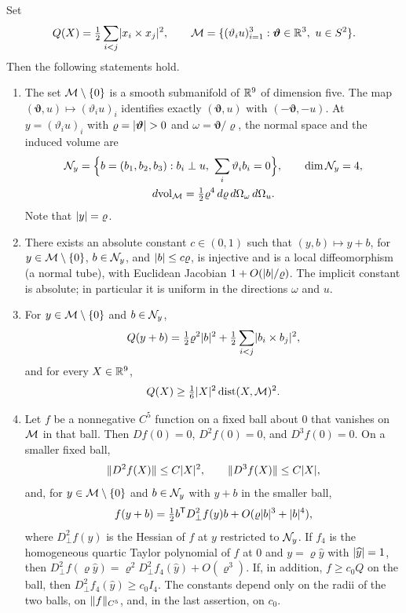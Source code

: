 \begin{lemma}\label{ch27:lem:commuting-cone}
Set
\[
 Q(X)=\tfrac12\sum_{i<j}\abs{x_i\times x_j}^2,\qquad\CommMan=\{(\vartheta_iu)_{i=1}^3:\bm\vartheta\in\R^3,\ u\in S^2\}.
\]
Then the following statements hold.
\begin{enumerate}
\item The set $\mathcal M\setminus\{0\}$ is a smooth submanifold of $\mathbb R^9$ of dimension five. The map $(\bm\vartheta,u)\mapsto(\vartheta_iu)_i$ identifies exactly $(\bm\vartheta,u)$ with $(-\bm\vartheta,-u)$. At $y=(\vartheta_iu)_i$ with $\varrho=\lvert \bm\vartheta\rvert>0$ and $\omega=\bm\vartheta/\varrho$, the normal space and the induced volume are
\begin{gather*}
 \NormalFiber y=\Bigl\{b=(b_1,b_2,b_3):b_i\perp u,\ \sum_i\vartheta_ib_i=0\Bigr\},\qquad\dim\NormalFiber y=4,\\
 d\mathrm{vol}_{\CommMan}=\tfrac12\varrho^4\,d\varrho\,d\Omega_\omega\,d\Omega_u.
\end{gather*}
Note that $\lvert y\rvert=\varrho$.
\item There exists an absolute constant $c\in(0,1)$ such that $(y,b)\mapsto y+b$, for $y\in\mathcal M\setminus\{0\}$, $b\in\mathcal N_{y}$, and $\lvert b\rvert\le c\varrho$, is injective and is a local diffeomorphism (a normal tube), with Euclidean Jacobian $1+O(\lvert b\rvert/\varrho)$. The implicit constant is absolute; in particular it is uniform in the directions $\omega$ and $u$.
\item For $y\in\mathcal M\setminus\{0\}$ and $b\in\mathcal N_{y}$,
\[
 Q(y+b)=\tfrac12\varrho^2\lvert b\rvert^2+\tfrac12\sum_{i<j}\lvert b_i\times b_j\rvert^2,
\]
and for every $X\in\mathbb R^9$,
\[
 Q(X)\ge\tfrac16\lvert X\rvert^2\operatorname{dist}(X,\mathcal M)^2.
\]
\item Let $f$ be a nonnegative $C^5$ function on a fixed ball about $0$ that vanishes on $\mathcal M$ in that ball. Then $Df(0)=0$, $D^2f(0)=0$, and $D^3f(0)=0$. On a smaller fixed ball,
\[
 \lVert D^2f(X)\rVert\le C\lvert X\rvert^2,\qquad\lVert D^3f(X)\rVert\le C\lvert X\rvert,
\]
and, for $y\in\mathcal M\setminus\{0\}$ and $b\in\mathcal N_{y}$ with $y+b$ in the smaller ball,
\[
 f(y+b)=\tfrac12b^{\mathsf T}D^2_\perp f(y)b+O(\varrho\lvert b\rvert^3+\lvert b\rvert^4),
\]
where $D^2_\perp f(y)$ is the Hessian of $f$ at $y$ restricted to $\mathcal N_{y}$. If $f_4$ is the homogeneous quartic Taylor polynomial of $f$ at $0$ and $y=\varrho\widehat y$ with $\lvert \widehat y\rvert=1$, then $D^2_\perp f(\varrho\widehat y)=\varrho^2D^2_\perp f_4(\widehat y)+O(\varrho^3)$. If, in addition, $f\ge c_0Q$ on the ball, then $D^2_\perp f_4(\widehat y)\ge c_0I_4$. The constants depend only on the radii of the two balls, on $\lVert f\rVert_{C^5}$, and, in the last assertion, on $c_0$.
\end{enumerate}
\end{lemma}

